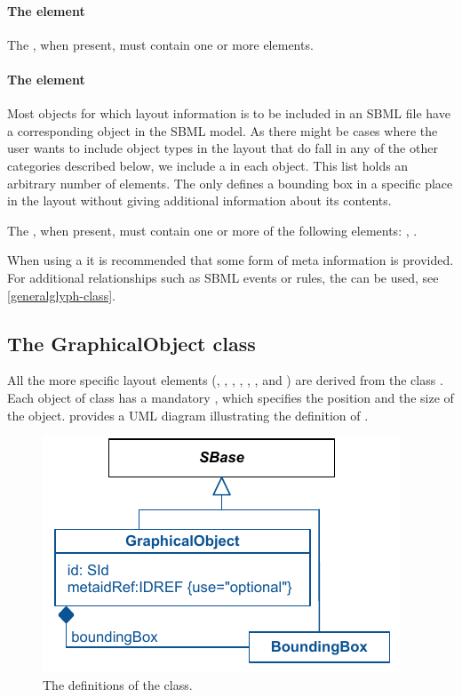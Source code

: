 \paragraph{The  element}
\label{listoftextglyphs-class}
The , when present, must contain one or more 
\TextGlyph elements. 


\paragraph{The  element}
\label{listofadditionalgraphicalobjects-class}
Most objects for which layout information is to be included in an SBML 
file have a corresponding object in the SBML model. As there might be 
cases where the user wants to include object types in the layout that do 
fall in any of the other categories described below, we include a 
 in each \Layout object. This 
list holds an arbitrary number of  elements. The 
 only defines a bounding box in a specific place 
in the layout without giving additional information about its contents. 

The , when present, must contain 
one or more of the following elements: \GraphicalObject, \GeneralGlyph. 

When using a \GraphicalObject it is recommended that some form of meta 
information is provided. For additional relationships such as SBML events 
or rules, the \GeneralGlyph can be used, see \ref{generalglyph-class}. 

\subsection{The GraphicalObject class} 
\label{graphicalobject-class}
All the more specific layout elements (\CompartmentGlyph, \GeneralGlyph, 
\SpeciesGlyph, \ReactionGlyph, \ReferenceGlyph, \TextGlyph, and 
\SpeciesReferenceGlyph) are derived from the class \GraphicalObject. 
Each object of class \GraphicalObject has a mandatory \BoundingBox, which
specifies the position and the size of the object.
 provides a UML diagram illustrating the definition
of \GraphicalObject.

\begin{figure}[!ht]
\includegraphics{uml/layout-graphicalobject-uml}
\caption{The definitions of the \GraphicalObject class.}
\label{uml:graphicalobject}
\end{figure}

